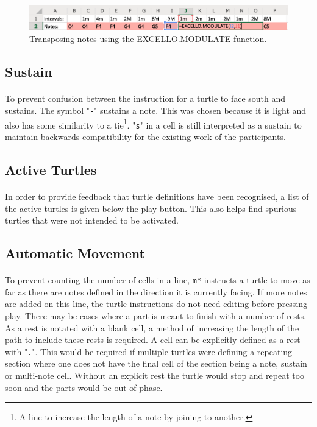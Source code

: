 \begin{figure}[tbh]
\centerline{\includegraphics[width=150mm]{figs/modulateFunction.png}}
\caption{Transposing notes using the EXCELLO.MODULATE function.}
\label{implementation:modulateFunction}
\end{figure}


\subsection{Sustain}

\paragraph{} To prevent confusion between the instruction for a turtle to face south and sustains. The symbol "\texttt{-}" sustains a note. This was chosen because it is light and also has some similarity to a tie\footnote{A line to increase the length of a note by joining to another.}. "\texttt{s}" in a cell is still interpreted as a sustain to maintain backwards compatibility for the existing work of the participants.

\subsection{Active Turtles}

\paragraph{} In order to provide feedback that turtle definitions have been recognised, a list of the active turtles is given below the play button. This also helps find spurious turtles that were not intended to be activated.

\subsection{Automatic Movement}

\paragraph{} To prevent counting the number of cells in a line, \texttt{m*} instructs a turtle to move as far as there are notes defined in the direction it is currently facing. If more notes are added on this line, the turtle instructions do not need editing before pressing play. There may be cases where a part is meant to finish with a number of rests. As a rest is notated with a blank cell, a method of increasing the length of the path to include these rests is required. A cell can be explicitly defined as a rest with "\texttt{.}". This would be required if multiple turtles were defining a repeating section where one does not have the final cell of the section being a note, sustain or multi-note cell. Without an explicit rest the turtle would stop and repeat too soon and the parts would be out of phase.

